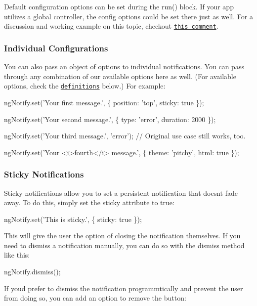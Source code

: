 Default configuration options can be set during the {\ttfamily run()} block. If your app utilizes a global controller, the config options could be set there just as well. For a discussion and working example on this topic, checkout \href{https://github.com/matowens/ng-notify/issues/16#issuecomment-104492193}{\tt this comment}.

\subsubsection*{Individual Configurations}

You can also pass an object of options to individual notifications. You can pass through any combination of our available options here as well. (For available options, check the \href{#definitions}{\tt definitions} below.) For example\+:


\begin{DoxyCode}
ngNotify.set('Your first message.', \{
    position: 'top',
    sticky: true
\});

ngNotify.set('Your second message.', \{
    type: 'error',
    duration: 2000
\});

ngNotify.set('Your third message.', 'error'); // Original use case still works, too.

ngNotify.set('Your <i>fourth</i> message.', \{
    theme: 'pitchy',
    html: true
\});
\end{DoxyCode}


\subsubsection*{Sticky Notifications}

Sticky notifications allow you to set a persistent notification that doesn\textquotesingle{}t fade away. To do this, simply set the {\ttfamily sticky} attribute to true\+:


\begin{DoxyCode}
ngNotify.set('This is sticky.', \{
    sticky: true
\});
\end{DoxyCode}


This will give the user the option of closing the notification themselves. If you need to dismiss a notification manually, you can do so with the {\ttfamily dismiss} method like this\+:


\begin{DoxyCode}
ngNotify.dismiss();
\end{DoxyCode}


If you\textquotesingle{}d prefer to dismiss the notification programmtically and prevent the user from doing so, you can add an option to remove the button\+:


